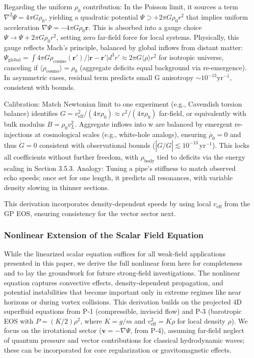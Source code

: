 \documentclass{article}
\begin{document}
Regarding the uniform $\rho_0$ contribution: In the Poisson limit, it sources a term $\nabla^2 \Psi = 4\pi G \rho_0$, yielding a quadratic potential $\Psi \supset +2\pi G \rho_0 r^2$ that implies uniform acceleration $\nabla \Psi = -4\pi G \rho_0 \mathbf{r}$. This is absorbed into a gauge choice $\Psi \to \Psi + 2\pi G \rho_0 r^2$, setting zero far-field force for local systems. Physically, this gauge reflects Mach's principle, balanced by global inflows from distant matter: $\Psi_{\text{global}} = \int 4\pi G \rho_{\text{cosmo}}(\mathbf{r}') / |\mathbf{r} - \mathbf{r}'| d^3 r' \approx 2\pi G \langle \rho \rangle r^2$ for isotropic universe, canceling if $\langle \rho_{\text{cosmo}} \rangle = \rho_0$ (aggregate deficits equal background via re-emergence). In asymmetric cases, residual term predicts small G anisotropy $\sim 10^{-13} \mathrm{yr}^{-1}$, consistent with bounds.

Calibration: Match Newtonian limit to one experiment (e.g., Cavendish torsion balance) identifies $G = v_{\text{eff}}^2 / (4\pi \rho_0) \approx c^2 / (4\pi \rho_0)$ far-field, or equivalently with bulk modulus $B = \rho_0 v_L^2$. Aggregate inflows into w are balanced by emergent re-injections at cosmological scales (e.g., white-hole analogs), ensuring $\dot{\rho_0} = 0$ and thus $\dot{G} = 0$ consistent with observational bounds ($ |\dot{G}/G| \lesssim 10^{-13} \, \mathrm{yr}^{-1} $). This locks all coefficients without further freedom, with $\rho_{\text{body}}$ tied to deficits via the energy scaling in Section 3.5.3. Analogy: Tuning a pipe's stiffness to match observed echo speeds; once set for one length, it predicts all resonances, with variable density slowing in thinner sections.

This derivation incorporates density-dependent speeds by using local $v_{\text{eff}}$ from the GP EOS, ensuring consistency for the vector sector next.

\subsubsection{Nonlinear Extension of the Scalar Field Equation}

While the linearized scalar equation suffices for all weak-field applications presented in this paper, we derive the full nonlinear form here for completeness and to lay the groundwork for future strong-field investigations. The nonlinear equation captures convective effects, density-dependent propagation, and potential instabilities that become important only in extreme regimes like near horizons or during vortex collisions. This derivation builds on the projected 4D superfluid equations from P-1 (compressible, inviscid flow) and P-3 (barotropic EOS with $P = (K/2) \rho^2$, where $K = g/m$ and $v_{\text{eff}}^2 = K \rho$ for local density $\rho$). We focus on the irrotational sector ($\mathbf{v} = -\nabla \Psi$, from P-4), assuming far-field neglect of quantum pressure and vector contributions for classical hydrodynamic waves; these can be incorporated for core regularization or gravitomagnetic effects.
\end{document}
